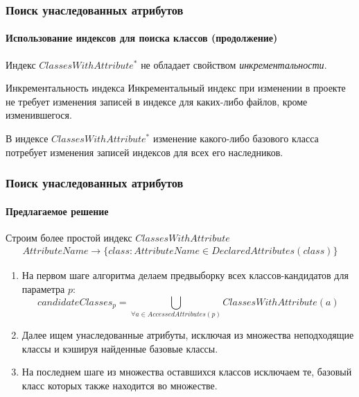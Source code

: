 \documentclass[handout]{beamer}
\begin{document}
\begin{frame}
  \frametitle{Поиск унаследованных атрибутов}
  \framesubtitle{Использование индексов для поиска классов (продолжение)}

  Индекс $ClassesWithAttribute^*$ не обладает свойством \emph{инкрементальности}.

  \begin{block}{Инкрементальность индекса}
    Инкрементальный индекс при изменении в проекте не требует изменения
    записей в индексе для каких-либо файлов, кроме изменившегося.
  \end{block}

  В индексе $ClassesWithAttribute^*$ изменение какого-либо базового класса
  потребует изменения записей индексов для всех его наследников.
\end{frame}

\begin{frame}
  \frametitle{Поиск унаследованных атрибутов}
  \framesubtitle{Предлагаемое решение}

  Строим более простой индекс $ClassesWithAttribute$
  \begin{multline*}
    AttributeName \rightarrow \{class: AttributeName \in DeclaredAttributes(class) \}
  \end{multline*}

  \begin{enumerate}
    \item На первом шаге алгоритма делаем предвыборку всех классов-кандидатов для
      параметра $p$:  
      \[
        candidateClasses_p = \bigcup\limits_{\forall{a} \in AccessedAttributes(p)}
        ClassesWithAttribute(a)
      \]

    \item Далее ищем унаследованные атрибуты, исключая из множества неподходящие классы
      и кэшируя найденные базовые классы.

    \item На последнем шаге из множества оставшихся классов исключаем те, базовый класс
      которых также находится во множестве.
  \end{enumerate}
\end{frame}
\end{document}
